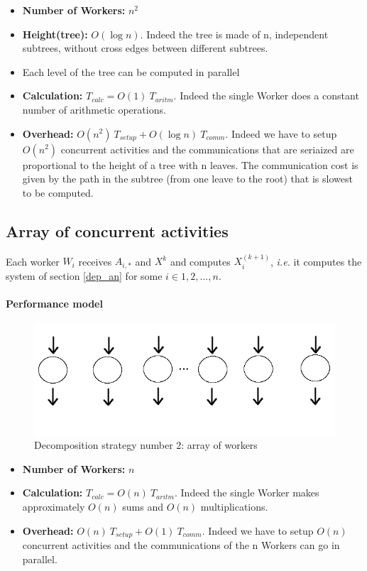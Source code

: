 \documentclass{article}
\begin{document}
\begin{itemize}
\item \textbf{Number of Workers:} $n^2$
\item \textbf{Height(tree):} $O(\log n)$. Indeed the tree is made of n, independent subtrees, without cross edges between different subtrees.
\item Each level of the tree can be computed in parallel
\item \textbf{Calculation:} $T_{calc} = O(1) \: T_{aritm}$. Indeed the single Worker does a constant number of arithmetic operations.
\item \textbf{Overhead:} $O(n^2) \: T_{setup} + O( \log n) \: T_{comm}$. Indeed we have to setup $O(n^2)$ concurrent activities and the communications that are seriaized are proportional to the height of a tree with n leaves. The communication cost is given by the path in the subtree (from one leave to the root) that is slowest to be computed.
\end{itemize}


\subsection{Array of concurrent activities}
Each worker $W_{i}$ receives $A_{i,*}$ and $X^{k}$ and computes $X_{i}^{(k+1)}$, \textit{i.e.} it computes the system of section \ref{dep_an} for some $i \in {1,2, ... , n}$.
\paragraph{Performance model} 

\begin{figure}[h]
\centering
\includegraphics[scale=0.43]{array_ca}
\caption{Decomposition strategy number 2: array of workers}
\label{fig:array_ca}
\end{figure} 

\begin{itemize}
\item \textbf{Number of Workers:} $n$
\item \textbf{Calculation:} $T_{calc} = O(n) \: T_{aritm}$. Indeed the single Worker makes approximately $O(n)$ sums and $O(n)$ multiplications.
\item \textbf{Overhead:} $O(n) \: T_{setup} + O(1)  \: T_{comm}$. Indeed we have to setup $O(n)$ concurrent activities and the communications of the n Workers can go in parallel.
\end{itemize}
\end{document}
